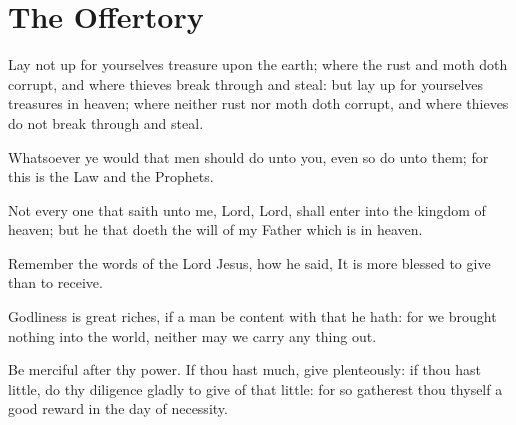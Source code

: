 \bigskip

\section{The Offertory}



Lay not up for yourselves treasure upon the earth; where the rust and moth doth corrupt, and where thieves break through and steal: but lay up for yourselves treasures in heaven; where neither rust nor moth doth corrupt, and where thieves do not break through and steal.

Whatsoever ye would that men should do unto you, even so do unto them; for this is the Law and the Prophets.

Not every one that saith unto me, Lord, Lord, shall enter into the kingdom of heaven; but he that doeth the will of my Father which is in heaven.

Remember the words of the Lord Jesus, how he said, It is more blessed to give than to receive.

Godliness is great riches, if a man be content with that he hath: for we brought nothing into the world, neither may we carry any thing out.

Be merciful after thy power. If thou hast much, give plenteously: if thou hast little, do thy diligence gladly to give of that little: for so gatherest thou thyself a good reward in the day of necessity.



